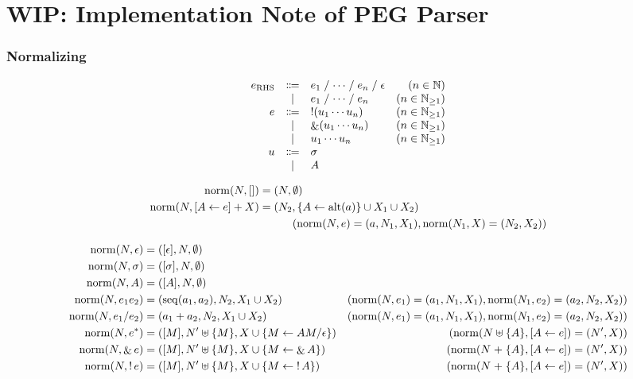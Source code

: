 \section{WIP: Implementation Note of PEG Parser}

\subsubsection{Normalizing}

\begin{align*}
  \begin{array}{rclr}
  e_{\mathrm{RHS}}
  & \Coloneq & e_1 \mathrel{/} \cdots \mathrel{/} e_n \mathrel{/} \epsilon &(n \in \Natural) \\
  & \mid & e_1 \mathrel{/} \cdots \mathrel{/} e_n &(n \in \Natural_{\geq 1}) \\
  e
  & \Coloneq & \mathop{!} (u_1 \cdots u_n) &(n \in \Natural_{\geq 1}) \\
  & \mid & \mathop{\&} (u_1 \cdots u_n) &(n \in \Natural_{\geq 1}) \\
  & \mid & u_1 \cdots u_n &(n \in \Natural_{\geq 1}) \\
  u
  & \Coloneq & \sigma \\
  & \mid & A
  \end{array}
\end{align*}

\begin{align*}
  \mathop{\mathrm{norm}}(N, []) &= (N, \emptyset) \\
  \mathop{\mathrm{norm}}(N, [A \gets e] + X) &= (N_2, \{A \gets \mathop{\mathrm{alt}}(a)\} \cup X_1 \cup X_2) \\
  &\hspace{3em}(\mathop{\mathrm{norm}}(N, e) = (a, N_1, X_1), \mathop{\mathrm{norm}}(N_1, X) = (N_2, X_2))
\end{align*}

\begin{align*}
  \mathop{\mathrm{norm}}(N, \epsilon) &= ([\epsilon], N, \emptyset) \\
  \mathop{\mathrm{norm}}(N, \sigma) &= ([\sigma], N, \emptyset) \\
  \mathop{\mathrm{norm}}(N, A) &= ([A], N, \emptyset) \\
  \mathop{\mathrm{norm}}(N, e_1 e_2) &= (\mathop{\mathrm{seq}}(a_1, a_2), N_2, X_1 \cup X_2) &(\mathop{\mathrm{norm}}(N, e_1) = (a_1, N_1, X_1), \mathop{\mathrm{norm}}(N_1, e_2) = (a_2, N_2, X_2)) \\
  \mathop{\mathrm{norm}}(N, e_1 / e_2) &= (a_1 + a_2, N_2, X_1 \cup X_2) &(\mathop{\mathrm{norm}}(N, e_1) = (a_1, N_1, X_1), \mathop{\mathrm{norm}}(N_1, e_2) = (a_2, N_2, X_2)) \\
  \mathop{\mathrm{norm}}(N, e^*) &= ([M], N' \uplus \{M\}, X \cup \{M \gets A M / \epsilon\}) &(\mathop{\mathrm{norm}}(N \uplus \{A\}, [A \gets e]) = (N', X)) \\
  \mathop{\mathrm{norm}}(N, \mathop{\&} e) &= ([M], N' \uplus \{M\}, X \cup \{M \gets \mathop{\&} A\}) &(\mathop{\mathrm{norm}}(N \mathrel{+} \{A\}, [A \gets e]) = (N', X)) \\
  \mathop{\mathrm{norm}}(N, \mathop{!} e) &= ([M], N' \uplus \{M\}, X \cup \{M \gets \mathop{!} A\}) &(\mathop{\mathrm{norm}}(N \mathrel{+} \{A\}, [A \gets e]) = (N', X))
\end{align*}

